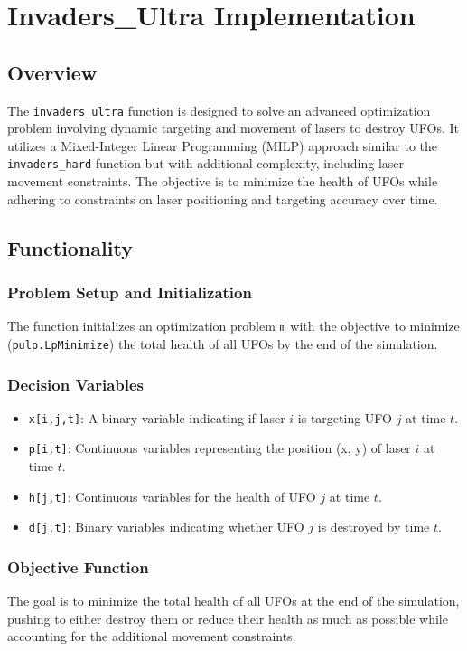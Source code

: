 \documentclass[12pt]{article}
\begin{document}
\section{Invaders\_Ultra Implementation}
\subsection{Overview}
The \texttt{invaders\_ultra} function is designed to solve an advanced optimization problem involving dynamic targeting and movement of lasers to destroy UFOs. It utilizes a Mixed-Integer Linear Programming (MILP) approach similar to the \texttt{invaders\_hard} function but with additional complexity, including laser movement constraints. The objective is to minimize the health of UFOs while adhering to constraints on laser positioning and targeting accuracy over time.

\subsection{Functionality}
\subsubsection{Problem Setup and Initialization}
The function initializes an optimization problem \texttt{m} with the objective to minimize (\texttt{pulp.LpMinimize}) the total health of all UFOs by the end of the simulation.

\subsubsection{Decision Variables}
\begin{itemize}
    \item \texttt{x[i,j,t]}: A binary variable indicating if laser $i$ is targeting UFO $j$ at time $t$.
    \item \texttt{p[i,t]}: Continuous variables representing the position (x, y) of laser $i$ at time $t$.
    \item \texttt{h[j,t]}: Continuous variables for the health of UFO $j$ at time $t$.
    \item \texttt{d[j,t]}: Binary variables indicating whether UFO $j$ is destroyed by time $t$.
\end{itemize}

\subsubsection{Objective Function}
The goal is to minimize the total health of all UFOs at the end of the simulation, pushing to either destroy them or reduce their health as much as possible while accounting for the additional movement constraints.
\end{document}
